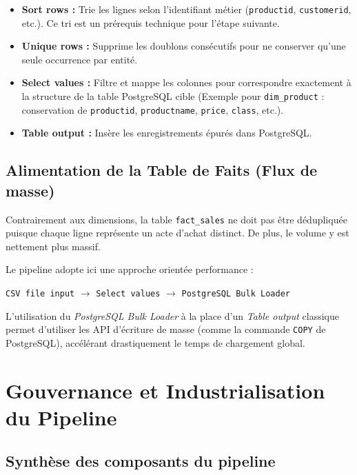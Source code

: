 \documentclass[12pt,a4paper,twoside]{report}
\begin{document}
\begin{itemize}
    \item \textbf{Sort rows :} Trie les lignes selon l'identifiant métier (\texttt{productid}, \texttt{customerid}, etc.). Ce tri est un prérequis technique pour l'étape suivante.
    \item \textbf{Unique rows :} Supprime les doublons consécutifs pour ne conserver qu'une seule occurrence par entité.
    \item \textbf{Select values :} Filtre et mappe les colonnes pour correspondre exactement à la structure de la table PostgreSQL cible (Exemple pour \texttt{dim\_product} : conservation de \texttt{productid}, \texttt{productname}, \texttt{price}, \texttt{class}, etc.).
    \item \textbf{Table output :} Insère les enregistrements épurés dans PostgreSQL.
\end{itemize}

\subsection{Alimentation de la Table de Faits (Flux de masse)}
Contrairement aux dimensions, la table \texttt{fact\_sales} ne doit pas être dédupliquée puisque chaque ligne représente un acte d'achat distinct. De plus, le volume y est nettement plus massif.

Le pipeline adopte ici une approche orientée performance :
\begin{center}
\texttt{CSV file input} $\longrightarrow$ \texttt{Select values} $\longrightarrow$ \texttt{PostgreSQL Bulk Loader}
\end{center}

L'utilisation du \textit{PostgreSQL Bulk Loader} à la place d'un \textit{Table output} classique permet d'utiliser les API d'écriture de masse (comme la commande \texttt{COPY} de PostgreSQL), accélérant drastiquement le temps de chargement global.

\section{Gouvernance et Industrialisation du Pipeline}

\subsection{Synthèse des composants du pipeline}
\end{document}

